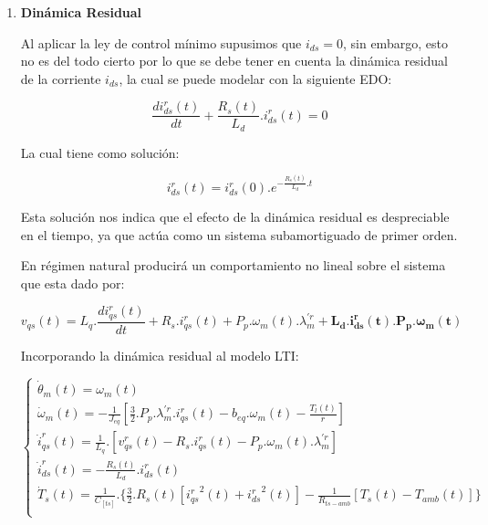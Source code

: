 \documentclass{article}
\begin{document}
\begin{enumerate}[label=\roman*.]
    

    \item \textbf{Dinámica Residual}
    
    Al aplicar la ley de control mínimo supusimos que $i_{ds} = 0$, sin embargo, esto no es del todo cierto
    por lo que se debe tener en cuenta la dinámica residual de la corriente $i_{ds}$, la cual se puede
    modelar con la siguiente EDO:

    \begin{equation}
        \frac{di_{ds}^r(t)}{dt} + \frac{R_{s}(t)}{L_{d}}.i_{ds}^r(t) = 0 
    \end{equation} 

    La cual tiene como solución:

    \begin{equation}
        i_{ds}^r(t) = i_{ds}^r(0).e^{-\frac{R_{s}(t)}{L_{d}}.t}
    \end{equation}

    Esta solución nos indica que el efecto de la dinámica residual es despreciable en el tiempo, ya que actúa como
    un sistema subamortiguado de primer orden.

    En régimen natural producirá un comportamiento no lineal sobre el sistema que esta dado por:

    \begin{equation}\label{eq.dinamica_residual}
        v_{qs}(t) = L_{q}.\frac{di_{qs}^r(t)}{dt} + R_{s}.i_{qs}^r(t) + P_{p}.\omega_{m}(t).\lambda_{m}^{\prime r} + \mathbf{L_{d}.i_{ds}^r(t).P_{p}.\omega_{m}(t)}
    \end{equation}

    Incorporando la dinámica residual al modelo LTI:    

    \begin{equation}
        \begin{cases}
            \dot{\theta}_{m}(t) = \omega_{m}(t)\\
            \dot{\omega}_{m}(t) = -\frac{1}{J_{eq}}[\frac{3}{2}.P_{p}.\lambda_{m}^{\prime r} .i_{qs}^r(t) - b_{eq}.\omega_{m}(t)-\frac{T_{l}(t)}{r}]\\
            \dot{i}_{qs}^r(t) = \frac{1}{L_{q}}.[v_{qs}^r(t) - R_{s}.i_{qs}^r(t) - P_{p}.\omega_{m}(t).\lambda_{m}^{\prime r}]\\
            \dot{i}_{ds}^r(t) = -\frac{R_{s}(t)}{L_{d}}.i_{ds}^r(t) \\
            \dot{T}_{s}(t) = \frac{1}{C_[ts]}.\{\frac{3}{2}.R_{s}(t)[{i_{qs}^r}^2(t) + {i_{ds}^r}^2(t)] - \frac{1}{R_{ts-amb}}[T_{s}(t) - T_{amb}(t)]\}\\
        \end{cases}    
    \end{equation}


\end{enumerate}
\end{document}
